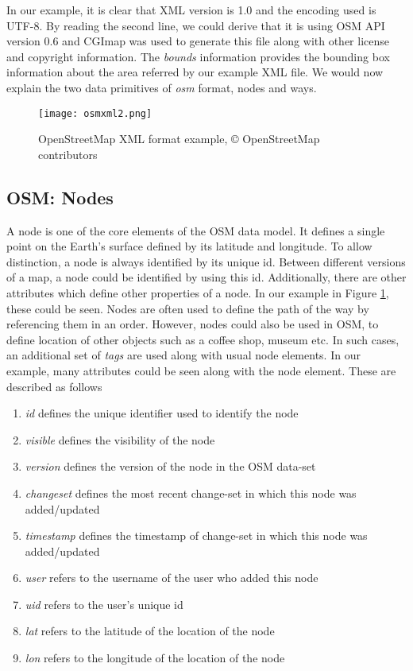 In our example, it is clear that XML version is 1.0 and the encoding used is UTF-8. By reading the second line, we could derive that it is using OSM API version 0.6 and CGImap was used to generate this file along with other license and copyright information. The \textit{bounds} information provides the bounding box information about the area referred by our example XML file. We would now explain the two data primitives of \textit{osm} format, nodes and ways.


\begin{figure}
\texttt{[image: osmxml2.png]}
\caption{OpenStreetMap XML format example, {\copyright} OpenStreetMap contributors }
\label{fg:osmxml}
\end{figure}

\subsection{OSM: Nodes}
A node is one of the core elements of the OSM data model. It defines a single point on the Earth's surface defined by its latitude and longitude. To allow distinction, a node is always identified by its unique id. Between different versions of a map, a node could be identified by using this id. Additionally, there are other attributes which define other properties of a node. In our example in Figure \ref{fg:osmxml}, these could be seen. Nodes are often used to define the path of the way by referencing them in an order. However, nodes could also be used in OSM, to define location of other objects such as a coffee shop, museum etc. In such cases, an additional set of \textit{tags} are used along with usual node elements. In our example, many attributes could be seen along with the node element. These are described as follows
\begin{enumerate}
\item \textit{id} defines the unique identifier used to identify the node
\item \textit{visible} defines the visibility of the node
\item \textit{version} defines the version of the node in the OSM data-set
\item \textit{changeset} defines the most recent change-set in which this node was added/updated
\item \textit{timestamp} defines the timestamp of change-set in which this node was added/updated
\item \textit{user} refers to the username of the user who added this node
\item \textit{uid} refers to the user's unique id 
\item \textit{lat} refers to the latitude of the location of the node
\item \textit{lon} refers to the longitude of the location of the node
\end{enumerate}
